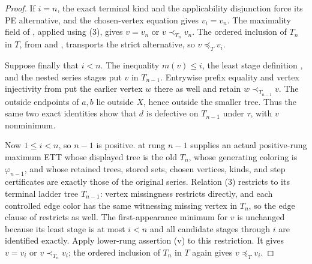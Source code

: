\begin{proof}
If \(i=n\), the exact terminal kind and the applicability disjunction
force its PE alternative, and the chosen-vertex equation gives
\(v_i=v_n\). The maximality field of
, applied using (3), gives
\(v=v_n\) or \(v\prec_{T_n}v_n\). The ordered inclusion of \(T_n\) in
\(T\), from  and
, transports the strict alternative,
so \(v\preceq_Tv_i\).

Suppose finally that \(i<n\). The inequality \(m(v)\leq i\), the least
stage definition , and the nested
series stages put \(v\) in \(T_{n-1}\). Entrywise prefix equality and
vertex injectivity from  put the earlier vertex
\(w\) there as well and retain \(w\prec_{T_{n-1}}v\). The outside
endpoints of \(a,b\) lie outside \(X\), hence outside the smaller tree.
Thus the same two exact identities show that \(d\) is defective on
\(T_{n-1}\) under \(\tau\), with \(v\) nonminimum.

Now \(1\leq i<n\), so \(n-1\) is positive.
 at rung \(n-1\) supplies an actual
positive-rung maximum ETT whose displayed tree is the old \(T_n\), whose
generating coloring is \(\varphi_{n-1}\), and whose retained trees,
stored sets, chosen vertices, kinds, and step certificates are exactly
those of the original series. Relation (3) restricts to its terminal
ladder tree \(T_{n-1}\): vertex missingness restricts directly, and
each controlled edge color has the same witnessing missing vertex in
\(T_n\), so the edge clause of  restricts as
well. The first-appearance minimum for \(v\) is unchanged because its
least stage is at most \(i<n\) and all candidate stages through \(i\)
are identified exactly. Apply lower-rung assertion (v) to this
restriction. It gives \(v=v_i\) or \(v\prec_{T_n}v_i\); the ordered
inclusion of \(T_n\) in \(T\) again gives \(v\preceq_Tv_i\).
\end{proof}
